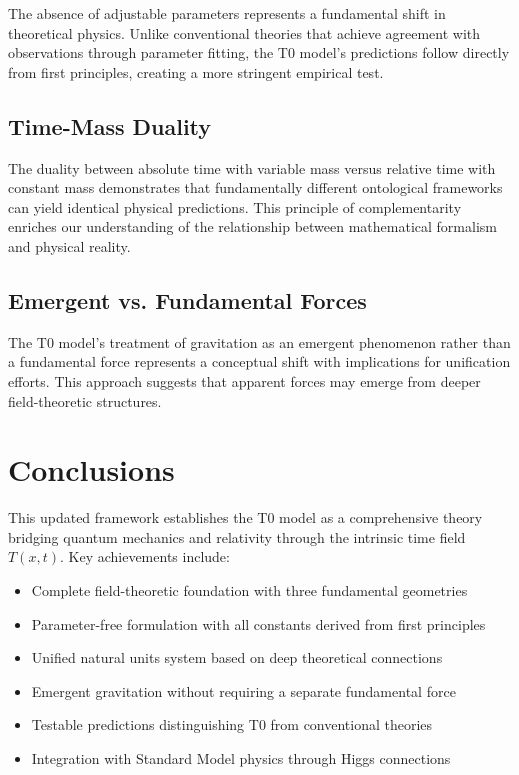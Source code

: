 \documentclass[twocolumn,aps,prl]{revtex4-2}
\newcommand{\Tfieldt}{T(x,t)}
\begin{document}
	The absence of adjustable parameters represents a fundamental shift in theoretical physics. Unlike conventional theories that achieve agreement with observations through parameter fitting, the T0 model's predictions follow directly from first principles, creating a more stringent empirical test.
	
	\subsection{Time-Mass Duality}
	\label{subsec:time_mass_duality_philosophy}
	
	The duality between absolute time with variable mass versus relative time with constant mass demonstrates that fundamentally different ontological frameworks can yield identical physical predictions. This principle of complementarity enriches our understanding of the relationship between mathematical formalism and physical reality.
	
	\subsection{Emergent vs. Fundamental Forces}
	\label{subsec:emergent_fundamental}
	
	The T0 model's treatment of gravitation as an emergent phenomenon rather than a fundamental force represents a conceptual shift with implications for unification efforts. This approach suggests that apparent forces may emerge from deeper field-theoretic structures.
	
	\section{Conclusions}
	\label{sec:conclusions}
	
	This updated framework establishes the T0 model as a comprehensive theory bridging quantum mechanics and relativity through the intrinsic time field \(\Tfieldt\). Key achievements include:
	
	\begin{itemize}
		\item Complete field-theoretic foundation with three fundamental geometries
		\item Parameter-free formulation with all constants derived from first principles
		\item Unified natural units system based on deep theoretical connections
		\item Emergent gravitation without requiring a separate fundamental force
		\item Testable predictions distinguishing T0 from conventional theories
		\item Integration with Standard Model physics through Higgs connections
	\end{itemize}
	
\end{document}
